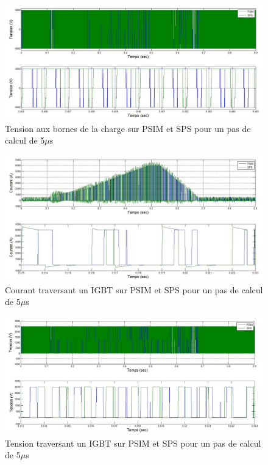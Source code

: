 \documentclass[11pt,letterpaper,final]{report}
\begin{document}
\begin{figure}[htb]
\centering
\includegraphics[scale=0.5]{Fig/DCPDCN/DCPTensionCharge5u.jpg}
\caption{Tension aux bornes de la charge sur PSIM et SPS pour un pas de calcul de 5$\mu$s}
\label{DC_ch_ten_5}
\end{figure}

\begin{figure}[htb]
\centering
\includegraphics[scale=0.5]{Fig/DCPDCN/DCPCourantIGBT5u.jpg}
\caption{Courant traversant un IGBT sur PSIM et SPS pour un pas de calcul de 5$\mu$s}
\label{DC_IG_cou_5}
\end{figure}



\begin{figure}[htb]
\centering
\includegraphics[scale=0.5]{Fig/DCPDCN/DCPTensionIGBT5u.jpg}
\caption{Tension traversant un IGBT sur PSIM et SPS pour un pas de calcul de 5$\mu$s}
\label{DC_IG_ten_5}
\end{figure}
\end{document}
